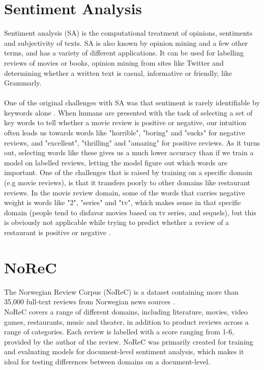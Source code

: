 \documentclass{report}
\begin{document}
\section{Sentiment Analysis}
Sentiment analysis (SA) is the computational treatment of opinions, sentiments and subjectivity of texts. SA is also known by opinion mining and a few other terms, and has a variety of different applications. It can be used for labelling reviews of movies or books, opinion mining from sites like Twitter and determining whether a written text is casual, informative or friendly, like Grammarly.\\\\
One of the original challenges with SA was that sentiment is rarely identifiable by keywords alone \cite{pang-etal-2002-thumbs}. When humans are presented with the task of selecting a set of key words to tell whether a movie review is positive or negative, our intuition often leads us towards words like "horrible", "boring" and "sucks" for negative reviews, and "excellent", "thrilling" and "amazing" for positive reviews. As it turns out, selecting words like these gives us a much lower accuracy than if we train a model on labelled reviews, letting the model figure out which words are important. One of the challenges that is raised by training on a specific domain (e.g movie reviews), is that it transfers poorly to other domains like restaurant reviews. In the movie review domain, some of the words that carries negative weight is words like "2", "series" and "tv", which makes sense in that specific domain (people tend to disfavor movies based on tv series, and sequels), but this is obviously not applicable while trying to predict whether a review of a restaurant is positive or negative \cite{taboada-etal-2011-lexicon}.
%

\section{NoReC}
The Norwegian Review Corpus (NoReC) is a dataset containing more than 35,000 full-text reviews from Norwegian news sources \cite{11509/124}.\\
NoReC covers a range of different domains, including literature, movies, video games, restaurants, music and theater, in addition to product reviews across a range of categories. Each review is labelled with a score ranging from 1-6, provided by the author of the review. NoReC was primarily created for training and evaluating models for document-level sentiment analysis, which makes it ideal for testing differences between domains on a document-level.
\end{document}
